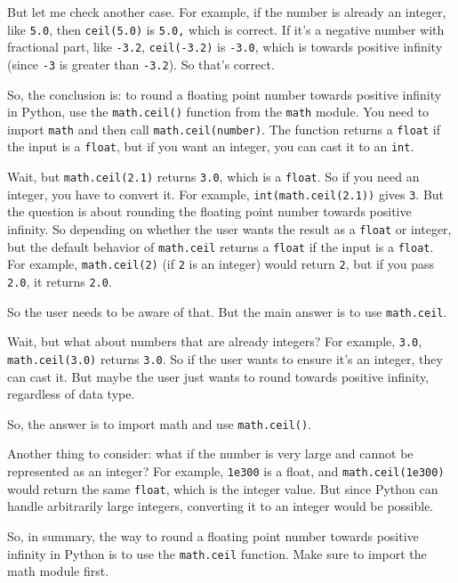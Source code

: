 But let me check another case.
For example, if the number is already an integer, like \texttt{5.0}, then \texttt{ceil(5.0)} is \texttt{5.0,} which is correct.
If it's a negative number with fractional part, like \texttt{-3.2}, \texttt{ceil(-3.2)} is \texttt{-3.0}, which is towards positive infinity (since \texttt{-3} is greater than \texttt{-3.2}).
So that's correct.\smallskip

So, the conclusion is:
to round a floating point number towards positive infinity in Python, use the \texttt{math.ceil()} function from the \texttt{math} module.
You need to import \texttt{math} and then call \texttt{math.ceil(number)}.
The function returns a \texttt{float} if the input is a \texttt{float}, but if you want an integer, you can cast it to an \texttt{int}.\smallskip

Wait, but \texttt{math.ceil(2.1)} returns \texttt{3.0}, which is a \texttt{float}.
So if you need an integer, you have to convert it.
For example, \texttt{int(math.ceil(2.1))} gives \texttt{3}.
But the question is about rounding the floating point number towards positive infinity.
So depending on whether the user wants the result as a \texttt{float} or integer, but the default behavior of \texttt{math.ceil} returns a \texttt{float} if the input is a \texttt{float}.
For example, \texttt{math.ceil(2)} (if \texttt{2} is an integer) would return \texttt{2}, but if you pass \texttt{2.0}, it returns \texttt{2.0}.\smallskip

So the user needs to be aware of that.
But the main answer is to use \texttt{math.ceil}.\smallskip

Wait, but what about numbers that are already integers?
For example, \texttt{3.0}, \texttt{math.ceil(3.0)} returns \texttt{3.0}.
So if the user wants to ensure it's an integer, they can cast it.
But maybe the user just wants to round towards positive infinity, regardless of data type.\smallskip

So, the answer is to import math and use \texttt{math.ceil()}.\smallskip

Another thing to consider:
what if the number is very large and cannot be represented as an integer?
For example, \texttt{1e300} is a float, and \texttt{math.ceil(1e300)} would return the same \texttt{float}, which is the integer value.
But since Python can handle arbitrarily large integers, converting it to an integer would be possible.\smallskip

So, in summary, the way to round a floating point number towards positive infinity in Python is to use the \texttt{math.ceil} function.
Make sure to import the math module first.\smallskip

